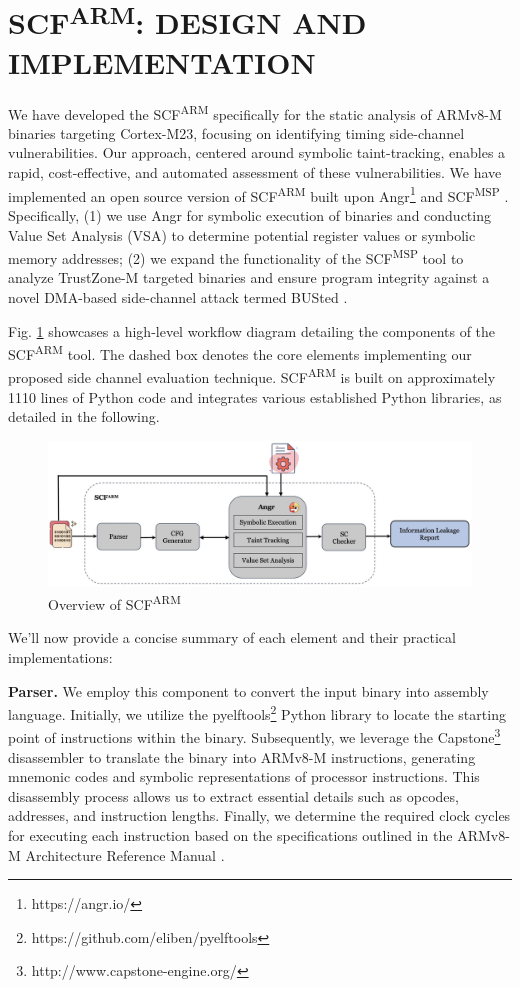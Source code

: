 \section{\ac{SCF}\textsuperscript{ARM}: DESIGN AND IMPLEMENTATION}

We have developed the \ac{SCF}\textsuperscript{ARM} specifically for the static analysis of ARMv8-M binaries targeting Cortex-M23, focusing on identifying timing side-channel vulnerabilities. Our approach, centered around symbolic taint-tracking, enables a rapid, cost-effective, and automated assessment of these vulnerabilities. We have implemented an open source  version of \ac{SCF}\textsuperscript{ARM} built upon Angr\footnote{https://angr.io/} and \ac{SCF}\textsuperscript{MSP} \cite{scfmsp}. Specifically, (1) we use Angr for symbolic execution of binaries and conducting Value Set Analysis (\ac{VSA}) to determine potential register values or symbolic memory addresses; (2) we expand the functionality of the \ac{SCF}\textsuperscript{MSP} tool to analyze TrustZone-M targeted binaries and ensure program integrity against a novel DMA-based side-channel attack termed BUSted \cite{busted}. 

Fig. \ref{fig:SCFARM} showcases a high-level workflow diagram detailing the components of the \ac{SCF}\textsuperscript{ARM} tool. The dashed box denotes the core elements implementing our proposed side channel evaluation technique. \ac{SCF}\textsuperscript{ARM} is built on approximately 1110 lines of Python code and integrates various established Python libraries, as detailed in the following.

\begin{figure}
  \centering
  \includegraphics[width=.9\textwidth]{figures/SCFARM.jpg}
  \caption{Overview of \ac{SCF}\textsuperscript{ARM}}
  \label{fig:SCFARM}
\end{figure}

We'll now provide a concise summary of each element and their practical implementations:

\textbf{Parser.} We employ this component to convert the input binary into assembly language. Initially, we utilize the pyelftools\footnote{https://github.com/eliben/pyelftools} Python library to locate the starting point of instructions within the binary. Subsequently, we leverage the Capstone\footnote{http://www.capstone-engine.org/} disassembler to translate the binary into ARMv8-M instructions, generating mnemonic codes and symbolic representations of processor instructions. This disassembly process allows us to extract essential details such as opcodes, addresses, and instruction lengths. Finally, we determine the required clock cycles for executing each instruction based on the specifications outlined in the ARMv8-M Architecture Reference Manual \cite{armv8m_ref_manual}.


